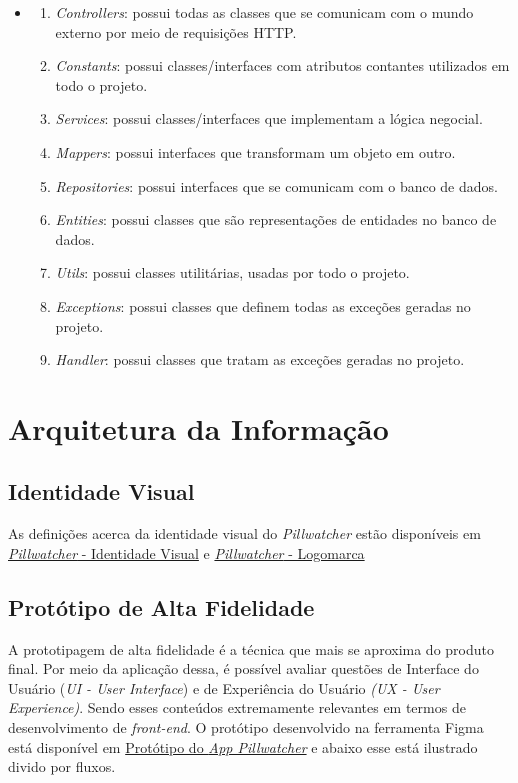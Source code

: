 \begin{itemize}
\item[]
    \begin{enumerate}
      \item \textit{Controllers}: possui todas as classes que se comunicam com o mundo externo por meio de requisições HTTP.
      \item \textit{Constants}: possui classes/interfaces com atributos contantes utilizados em todo o projeto.
      \item \textit{Services}: possui classes/interfaces que implementam a lógica negocial.
      \item \textit{Mappers}: possui interfaces que transformam um objeto em outro.
      \item \textit{Repositories}: possui interfaces que se comunicam com o banco de dados.
      \item \textit{Entities}: possui classes que são representações de entidades no banco de dados.
      \item \textit{Utils}: possui classes utilitárias, usadas por todo o projeto.
      \item \textit{Exceptions}: possui classes que definem todas as exceções geradas no projeto.
      \item \textit{Handler}: possui classes que tratam as exceções geradas no projeto.
    \end{enumerate}
\end{itemize}

\section{Arquitetura da Informação}

\subsection{Identidade Visual}
As definições acerca da identidade visual do \emph{Pillwatcher} estão disponíveis em \href{https://github.com/PillWatcher/Documentacao/wiki/Identidade-Visual}{\emph{Pillwatcher} - Identidade Visual} e \href{https://github.com/PillWatcher/Documentacao/wiki/Logomarca}{\emph{Pillwatcher} - Logomarca}

\subsection{Protótipo de Alta Fidelidade}
A prototipagem de alta fidelidade é a técnica que mais se aproxima do produto final. Por meio da aplicação dessa, é possível avaliar questões de Interface do Usuário (\emph{UI -  User Interface}) e de Experiência do Usuário \emph{(UX - User Experience)}. Sendo esses conteúdos extremamente relevantes em termos de desenvolvimento de \textit{front-end}. O protótipo desenvolvido na ferramenta Figma está disponível em \href{https://www.figma.com/proto/60dT2EKBbcIPKy5Tg0Zzpg/App_Pillwatcher?node-id=1\%3A5\&scaling=scale-down}{Protótipo do \emph{App Pillwatcher}} e abaixo esse está ilustrado divido por fluxos.  


